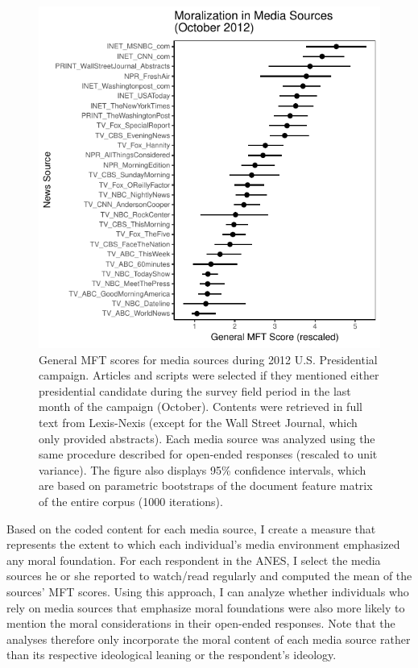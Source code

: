 \documentclass[12pt]{article}
\begin{document}
\begin{figure}[ht]\centering
\includegraphics{../calc/fig/media_desc.pdf}
\caption{General MFT scores for media sources during 2012 U.S. Presidential campaign. Articles and scripts were selected if they mentioned either presidential candidate during the survey field period in the last month of the campaign (October). Contents were retrieved in full text from Lexis-Nexis (except for the Wall Street Journal, which only provided abstracts). Each media source was analyzed using the same procedure described for open-ended responses (rescaled to unit variance). The figure also displays 95\% confidence intervals, which are based on parametric bootstraps of the document feature matrix of the entire corpus (1000 iterations).}\label{fig:media_desc}
\end{figure}


Based on the coded content for each media source, I create a measure that represents the extent to which each individual's media environment emphasized any moral foundation. For each respondent in the ANES, I select the media sources he or she reported to watch/read regularly and computed the mean of the sources' MFT scores. Using this approach, I can analyze whether individuals who rely on media sources that emphasize moral foundations were also more likely to mention the moral considerations in their open-ended responses. Note that the analyses therefore only incorporate the moral content of each media source rather than its respective ideological leaning or the respondent's ideology.
\end{document}

